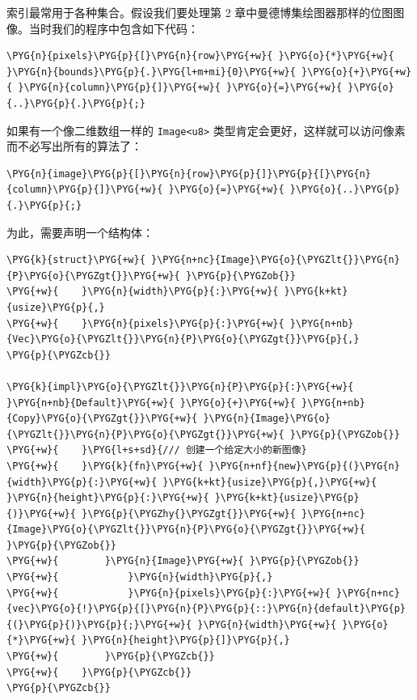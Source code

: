 索引最常用于各种集合。假设我们要处理第 2 章中曼德博集绘图器那样的位图图像。当时我们的程序中包含如下代码：

\begin{Verbatim}[commandchars=\\\{\},breaklines=true,breakanywhere=true,fontsize=\codefont,xleftmargin=17bp]
\PYG{n}{pixels}\PYG{p}{[}\PYG{n}{row}\PYG{+w}{ }\PYG{o}{*}\PYG{+w}{ }\PYG{n}{bounds}\PYG{p}{.}\PYG{l+m+mi}{0}\PYG{+w}{ }\PYG{o}{+}\PYG{+w}{ }\PYG{n}{column}\PYG{p}{]}\PYG{+w}{ }\PYG{o}{=}\PYG{+w}{ }\PYG{o}{..}\PYG{p}{.}\PYG{p}{;}
\end{Verbatim}

如果有一个像二维数组一样的 \texttt{Image<u8>} 类型肯定会更好，这样就可以访问像素而不必写出所有的算法了：

\begin{Verbatim}[commandchars=\\\{\},breaklines=true,breakanywhere=true,fontsize=\codefont,xleftmargin=17bp]
\PYG{n}{image}\PYG{p}{[}\PYG{n}{row}\PYG{p}{]}\PYG{p}{[}\PYG{n}{column}\PYG{p}{]}\PYG{+w}{ }\PYG{o}{=}\PYG{+w}{ }\PYG{o}{..}\PYG{p}{.}\PYG{p}{;}
\end{Verbatim}

为此，需要声明一个结构体：

\begin{Verbatim}[commandchars=\\\{\},breaklines=true,breakanywhere=true,fontsize=\codefont,xleftmargin=17bp]
\PYG{k}{struct}\PYG{+w}{ }\PYG{n+nc}{Image}\PYG{o}{\PYGZlt{}}\PYG{n}{P}\PYG{o}{\PYGZgt{}}\PYG{+w}{ }\PYG{p}{\PYGZob{}}
\PYG{+w}{    }\PYG{n}{width}\PYG{p}{:}\PYG{+w}{ }\PYG{k+kt}{usize}\PYG{p}{,}
\PYG{+w}{    }\PYG{n}{pixels}\PYG{p}{:}\PYG{+w}{ }\PYG{n+nb}{Vec}\PYG{o}{\PYGZlt{}}\PYG{n}{P}\PYG{o}{\PYGZgt{}}\PYG{p}{,}
\PYG{p}{\PYGZcb{}}

\PYG{k}{impl}\PYG{o}{\PYGZlt{}}\PYG{n}{P}\PYG{p}{:}\PYG{+w}{ }\PYG{n+nb}{Default}\PYG{+w}{ }\PYG{o}{+}\PYG{+w}{ }\PYG{n+nb}{Copy}\PYG{o}{\PYGZgt{}}\PYG{+w}{ }\PYG{n}{Image}\PYG{o}{\PYGZlt{}}\PYG{n}{P}\PYG{o}{\PYGZgt{}}\PYG{+w}{ }\PYG{p}{\PYGZob{}}
\PYG{+w}{    }\PYG{l+s+sd}{/// 创建一个给定大小的新图像}
\PYG{+w}{    }\PYG{k}{fn}\PYG{+w}{ }\PYG{n+nf}{new}\PYG{p}{(}\PYG{n}{width}\PYG{p}{:}\PYG{+w}{ }\PYG{k+kt}{usize}\PYG{p}{,}\PYG{+w}{ }\PYG{n}{height}\PYG{p}{:}\PYG{+w}{ }\PYG{k+kt}{usize}\PYG{p}{)}\PYG{+w}{ }\PYG{p}{\PYGZhy{}\PYGZgt{}}\PYG{+w}{ }\PYG{n+nc}{Image}\PYG{o}{\PYGZlt{}}\PYG{n}{P}\PYG{o}{\PYGZgt{}}\PYG{+w}{ }\PYG{p}{\PYGZob{}}
\PYG{+w}{        }\PYG{n}{Image}\PYG{+w}{ }\PYG{p}{\PYGZob{}}
\PYG{+w}{            }\PYG{n}{width}\PYG{p}{,}
\PYG{+w}{            }\PYG{n}{pixels}\PYG{p}{:}\PYG{+w}{ }\PYG{n+nc}{vec}\PYG{o}{!}\PYG{p}{[}\PYG{n}{P}\PYG{p}{::}\PYG{n}{default}\PYG{p}{(}\PYG{p}{)}\PYG{p}{;}\PYG{+w}{ }\PYG{n}{width}\PYG{+w}{ }\PYG{o}{*}\PYG{+w}{ }\PYG{n}{height}\PYG{p}{]}\PYG{p}{,}
\PYG{+w}{        }\PYG{p}{\PYGZcb{}}
\PYG{+w}{    }\PYG{p}{\PYGZcb{}}
\PYG{p}{\PYGZcb{}}
\end{Verbatim}

